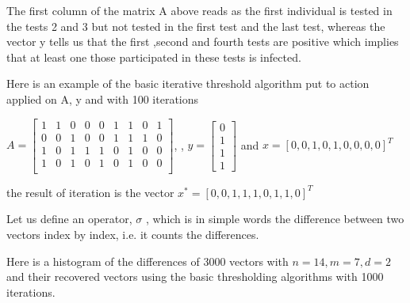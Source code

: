 The first column of the matrix A above reads as the first individual is tested in the tests 2 and 3 but not tested in the first test and the last test, whereas the vector y tells us that the first ,second and fourth tests are positive which implies that at least one those participated in these tests is infected. 



Here is an example of the basic iterative threshold algorithm put to action applied on A, y and with 100 iterations


$ A =  \begin{bmatrix}
1 & 1 & 0 & 0 & 0 & 1 & 1 & 0 &1 \\
0 & 0 & 1 & 0 & 0 & 1 & 1 & 1 &0 \\
1 & 0 & 1 & 1 & 1 & 0 & 1 & 0 &0 \\
1 & 0 & 1 & 0 & 1 & 0 & 1 & 0 &0 \\
\end{bmatrix}$,  \quad , $y = \begin{bmatrix}
0\\
1\\
1\\
1
\end{bmatrix}$
and $ x = [0, 0, 1, 0, 1, 0, 0, 0, 0]^{T} $ 


the result of iteration is the vector $ x^* = [0, 0, 1, 1, 1, 0, 1, 1, 0]^{T} $ 

Let us define an operator, $\sigma$  , which is in simple words the difference between two vectors index by index, i.e. it counts the differences. 

Here is a histogram of the differences of 3000 vectors with $ n = 14, m= 7, d = 2 $ and their recovered vectors using the basic thresholding algorithms with 1000 iterations. 

